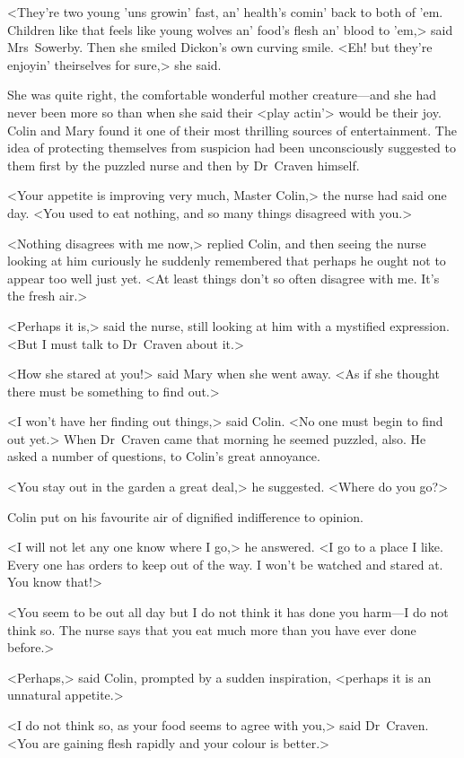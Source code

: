 <They're two young 'uns growin' fast, an' health's comin' back to both of 'em. Children like that feels like young wolves an' food's flesh an' blood to 'em,> said Mrs~Sowerby. Then she smiled Dickon's own curving smile. <Eh! but they're enjoyin' theirselves for sure,> she said.

She was quite right, the comfortable wonderful mother creature—and she had never been more so than when she said their <play actin'> would be their joy. Colin and Mary found it one of their most thrilling sources of entertainment. The idea of protecting themselves from suspicion had been unconsciously suggested to them first by the puzzled nurse and then by Dr~Craven himself.

<Your appetite is improving very much, Master Colin,> the nurse had said one day. <You used to eat nothing, and so many things disagreed with you.>

<Nothing disagrees with me now,> replied Colin, and then seeing the nurse looking at him curiously he suddenly remembered that perhaps he ought not to appear too well just yet. <At least things don't so often disagree with me. It's the fresh air.>

<Perhaps it is,> said the nurse, still looking at him with a mystified expression. <But I must talk to Dr~Craven about it.>

<How she stared at you!> said Mary when she went away. <As if she thought there must be something to find out.>

<I won't have her finding out things,> said Colin. <No one must begin to find out yet.> When Dr~Craven came that morning he seemed puzzled, also. He asked a number of questions, to Colin's great annoyance.

<You stay out in the garden a great deal,> he suggested. <Where do you go?>

Colin put on his favourite air of dignified indifference to opinion.

<I will not let any one know where I go,> he answered. <I go to a place I like. Every one has orders to keep out of the way. I won't be watched and stared at. You know that!>

<You seem to be out all day but I do not think it has done you harm—I do not think so. The nurse says that you eat much more than you have ever done before.>

<Perhaps,> said Colin, prompted by a sudden inspiration, <perhaps it is an unnatural appetite.>

<I do not think so, as your food seems to agree with you,> said Dr~Craven. <You are gaining flesh rapidly and your colour is better.>

